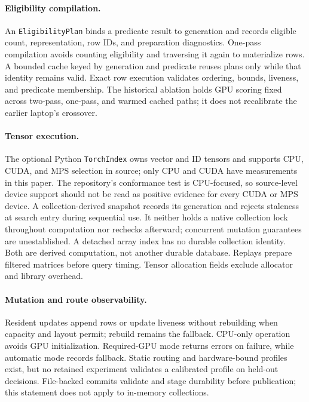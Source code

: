 \documentclass[10pt]{article}
\begin{document}
\paragraph{Eligibility compilation.}
An \texttt{EligibilityPlan} binds a predicate result to generation and records eligible count, representation, row IDs, and preparation diagnostics. One-pass compilation avoids counting eligibility and traversing it again to materialize rows. A bounded cache keyed by generation and predicate reuses plans only while that identity remains valid. Exact row execution validates ordering, bounds, liveness, and predicate membership. The historical ablation holds GPU scoring fixed across two-pass, one-pass, and warmed cached paths; it does not recalibrate the earlier laptop's crossover.

\paragraph{Tensor execution.}
The optional Python \texttt{TorchIndex} owns vector and ID tensors and supports CPU, CUDA, and MPS selection in source; only CPU and CUDA have measurements in this paper. The repository's conformance test is CPU-focused, so source-level device support should not be read as positive evidence for every CUDA or MPS device. A collection-derived snapshot records its generation and rejects staleness at search entry during sequential use. It neither holds a native collection lock throughout computation nor rechecks afterward; concurrent mutation guarantees are unestablished. A detached array index has no durable collection identity. Both are derived computation, not another durable database. Replays prepare filtered matrices before query timing. Tensor allocation fields exclude allocator and library overhead.

\paragraph{Mutation and route observability.}
Resident updates append rows or update liveness without rebuilding when capacity and layout permit; rebuild remains the fallback. CPU-only operation avoids GPU initialization. Required-GPU mode returns errors on failure, while automatic mode records fallback. Static routing and hardware-bound profiles exist, but no retained experiment validates a calibrated profile on held-out decisions. File-backed commits validate and stage durability before publication; this statement does not apply to in-memory collections.
\end{document}
